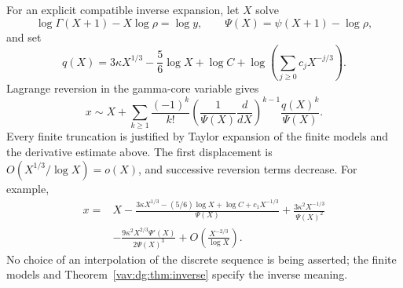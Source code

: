 \documentclass[11pt]{article}
\theoremstyle{remark}\newtheorem{remark}[theorem]{Remark}
\begin{document}
For an explicit compatible inverse expansion, let $X$ solve
\[
 \log\Gamma(X+1)-X\log\rho=\log y,\qquad
 \Psi(X)=\psi(X+1)-\log\rho,
\]
and set
\[
 q(X)=3\kappa X^{1/3}-\frac56\log X+\log C
                 +\log\left(\sum_{j\ge0}c_jX^{-j/3}\right).
\]
Lagrange reversion in the gamma-core variable gives
\begin{equation}\label{vav:dg:eq:invformal}
 x\sim X+\sum_{k\ge1}\frac{(-1)^k}{k!}
 \left(\frac1{\Psi(X)}\frac d{dX}\right)^{k-1}
             \frac{q(X)^k}{\Psi(X)}.
\end{equation}
Every finite truncation is justified by Taylor expansion of the finite
models and the derivative estimate above. The first displacement is
$O(X^{1/3}/\log X)=o(X)$, and successive reversion terms decrease.
For example,
\begin{align}
 x={}&X-\frac{3\kappa X^{1/3}-(5/6)\log X+\log C+c_1X^{-1/3}}
                  {\Psi(X)}
       +\frac{3\kappa^2X^{-1/3}}{\Psi(X)^2}\nonumber\\
    &-\frac{9\kappa^2X^{2/3}\Psi'(X)}{2\Psi(X)^3}
       +O\left(\frac{X^{-2/3}}{\log X}\right).
\end{align}
No choice of an interpolation of the discrete sequence is being asserted;
the finite models and Theorem~\ref{vav:dg:thm:inverse} specify the inverse meaning.
\end{document}
